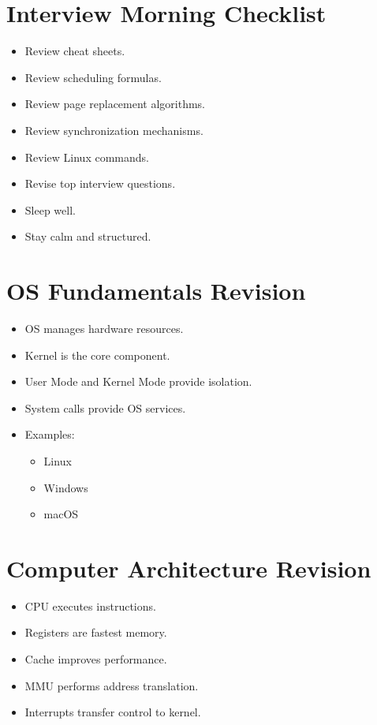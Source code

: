 \section{Interview Morning Checklist}

\begin{itemize}
\item Review cheat sheets.
\item Review scheduling formulas.
\item Review page replacement algorithms.
\item Review synchronization mechanisms.
\item Review Linux commands.
\item Revise top interview questions.
\item Sleep well.
\item Stay calm and structured.
\end{itemize}

\newpage

\section{OS Fundamentals Revision}

\begin{itemize}
\item OS manages hardware resources.
\item Kernel is the core component.
\item User Mode and Kernel Mode provide isolation.
\item System calls provide OS services.
\item Examples:
\begin{itemize}
\item Linux
\item Windows
\item macOS
\end{itemize}
\end{itemize}

\section{Computer Architecture Revision}

\begin{itemize}
\item CPU executes instructions.
\item Registers are fastest memory.
\item Cache improves performance.
\item MMU performs address translation.
\item Interrupts transfer control to kernel.
\end{itemize}

